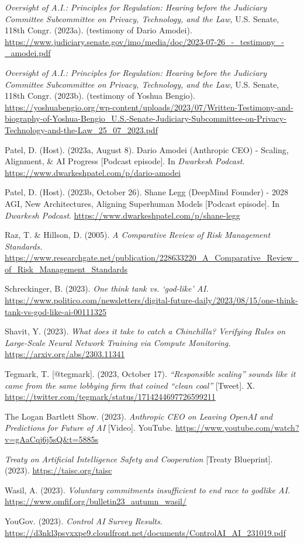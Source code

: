 \documentclass[12pt,a4paper]{article}
\begin{document}
\textit{Oversight of A.I.: Principles for Regulation: Hearing before the Judiciary Committee Subcommittee on Privacy, Technology, and the Law,} U.S. Senate, 118th Congr. (2023a). (testimony of Dario Amodei). \url{https://www.judiciary.senate.gov/imo/media/doc/2023-07-26_-_testimony_-_amodei.pdf}

\textit{Oversight of A.I.: Principles for Regulation: Hearing before the Judiciary Committee Subcommittee on Privacy, Technology, and the Law,} U.S. Senate, 118th Congr. (2023b). (testimony of Yoshua Bengio). \url{https://yoshuabengio.org/wp-content/uploads/2023/07/Written-Testimony-and-biography-of-Yoshua-Bengio_U.S.-Senate-Judiciary-Subcommittee-on-Privacy-Technology-and-the-Law_25_07_2023.pdf}

Patel, D. (Host). (2023a, August 8). Dario Amodei (Anthropic CEO) - Scaling, Alignment, \& AI Progress [Podcast episode]. In \textit{Dwarkesh Podcast}.  \url{https://www.dwarkeshpatel.com/p/dario-amodei}

Patel, D. (Host). (2023b, October 26). Shane Legg (DeepMind Founder) - 2028 AGI, New Architectures, Aligning Superhuman Models [Podcast episode]. In \textit{Dwarkesh Podcast}. \url{https://www.dwarkeshpatel.com/p/shane-legg}

Raz, T. \& Hillson, D. (2005). \textit{A Comparative Review of Risk Management Standards.} \url{https://www.researchgate.net/publication/228633220_A_Comparative_Review_of_Risk_Management_Standards}

Schreckinger, B. (2023). \textit{One think tank vs. ‘god-like’ AI.} \url{https://www.politico.com/newsletters/digital-future-daily/2023/08/15/one-think-tank-vs-god-like-ai-00111325}

Shavit, Y. (2023). \textit{What does it take to catch a Chinchilla? Verifying Rules on Large-Scale Neural Network Training via Compute Monitoring. }\url{https://arxiv.org/abs/2303.11341}

Tegmark, T. [@tegmark]. (2023, October 17). \textit{“Responsible scaling” sounds like it came from the same lobbying firm that coined “clean coal”} [Tweet]. X. \url{https://twitter.com/tegmark/status/1714244697726599211}

The Logan Bartlett Show. (2023). \textit{Anthropic CEO on Leaving OpenAI and Predictions for Future of AI} [Video]. YouTube. \url{https://www.youtube.com/watch?v=gAaCqj6j5sQ&t=5885s}

\textit{Treaty on Artificial Intelligence Safety and Cooperation} [Treaty Blueprint]. (2023). \url{https://taisc.org/taisc}

Wasil, A. (2023). \textit{Voluntary commitments insufficient to end race to godlike AI.} \url{https://www.omfif.org/bulletin23_autumn_wasil/}

YouGov. (2023). \textit{Control AI Survey Results}. \url{ https://d3nkl3psvxxpe9.cloudfront.net/documents/ControlAI_AI_231019.pdf}
\end{document}
